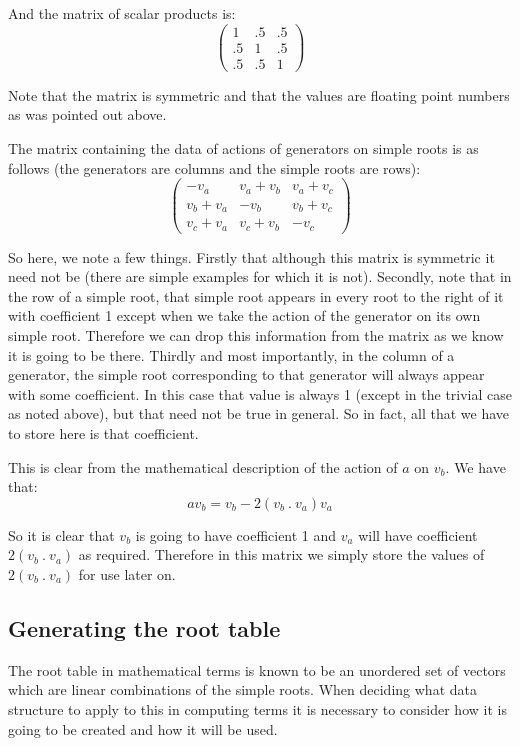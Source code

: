 \documentclass[a4paper,12pt]{article}
\begin{document}
And the matrix of scalar products is:
\[ \left(\begin{array}{ccc}
	1 & .5 & .5 \\
	.5 & 1 & .5 \\
	.5 & .5 & 1
\end{array}\right) \]

Note that the matrix is symmetric and that the values are floating point numbers as was pointed out above.

The matrix containing the data of actions of generators on simple roots is as follows (the generators are columns and the simple roots are rows):
\[\left(\begin{array}{ccc}
	-v_a & v_a + v_b & v_a + v_c \\
	v_b + v_a & -v_b & v_b + v_c \\
	v_c + v_a & v_c + v_b & -v_c
\end{array}\right) \]

So here, we note a few things. Firstly that although this matrix is symmetric it need not be (there are simple examples for which it is not). Secondly, note that in the row of a simple root, that simple root appears in every root to the right of it with coefficient 1 except when we take the action of the generator on its own simple root. Therefore we can drop this information from the matrix as we know it is going to be there. Thirdly and most importantly, in the column of a generator, the simple root corresponding to that generator will always appear with some coefficient. In this case that value is always 1 (except in the trivial case as noted above), but that need not be true in general. So in fact, all that we have to store here is that coefficient.

This is clear from the mathematical description of the action of $a$ on $v_b$. We have that:
\[av_b = v_b - 2(v_b \: . \: v_a)v_a \]

So it is clear that $v_b$ is going to have coefficient 1 and $v_a$ will have coefficient $2(v_b \: . \: v_a)$ as required. Therefore in this matrix we simply store the values of $2(v_b \: . \: v_a)$ for use later on.

\subsection{Generating the root table}

The root table in mathematical terms is known to be an unordered set of vectors which are linear combinations of the simple roots. When deciding what data structure to apply to this in computing terms it is necessary to consider how it is going to be created and how it will be used. 
\end{document}
